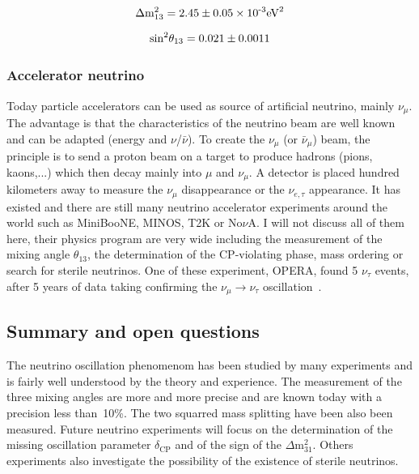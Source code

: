 \documentclass[main.tex]{subfiles}
\begin{document}
\begin{gather}
\Delta\text{m}_{\text{13}}^{\text{2}} = \text{2.45} \pm \text{0.05} \times \text{10}^{\text{\text{-3}}} \text{eV}^\text{2}
\nonumber\\[1.5ex]
\text{sin}^\text{2} \theta_{\text{13}} = \text{0.021} \pm \text{0.0011} 
\end{gather} 


\FloatBarrier


\subsubsection{Accelerator neutrino}


\NI Today particle accelerators can be used as source of artificial neutrino, mainly $\nu_\mu$. The advantage is that the characteristics of the neutrino beam are well known and can be adapted (energy and $\nu$/$\bar{\nu}$). To create the $\nu_\mu$ (or $\bar{\nu}_\mu$) beam, the principle is to send a proton beam on a target to produce hadrons (pions, kaons,...) which then decay mainly into $\mu$ and $\nu_\mu$. A detector is placed hundred kilometers away to measure the $\nu_\mu$ disappearance or the $\nu_{e,\tau}$ appearance. It has existed and there are still many neutrino accelerator experiments around the world such as MiniBooNE, MINOS, T2K or No$\nu$A. I will not discuss all of them here, their physics program are very wide including the measurement of the mixing angle $\theta_\text{13}$, the determination of the CP-violating phase, mass ordering or search for sterile neutrinos. One of these experiment, OPERA, found 5 $\nu_\tau$ events, after 5 years of data taking confirming the $\nu_\mu \rightarrow \nu_\tau$ oscillation~\cite{Opera,OperaTau}.




\FloatBarrier


\subsection{Summary and open questions}\label{sec:SummaryOpenQuestions}


\NI The neutrino oscillation phenomenom has been studied by many experiments and is fairly well understood by the theory and experience. The measurement of the three mixing angles are more and more precise and are known today with a precision less than~10\%. The two squarred mass splitting have been also been measured. Future neutrino experiments will focus on the determination of the missing oscillation parameter $\delta_\text{CP}$ and of the sign of the $\Delta\text{m}^\text{2}_\text{31}$. Others experiments also investigate the possibility of the existence of sterile neutrinos.
\end{document}
